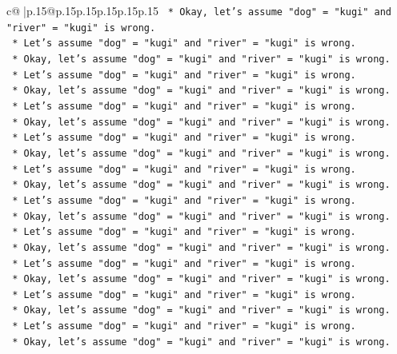 \documentclass{article}
\begin{document}
{\begin{supertabular}{c@{$\;$}|p{.15\linewidth}@{}p{.15\linewidth}p{.15\linewidth}p{.15\linewidth}p{.15\linewidth}p{.15\linewidth}}
{{{\texttt{        *   Okay, let's assume "dog" = "kugi" and "river" = "kugi" is wrong.} \\
\texttt{        *   Let's assume "dog" = "kugi" and "river" = "kugi" is wrong.} \\
\texttt{        *   Okay, let's assume "dog" = "kugi" and "river" = "kugi" is wrong.} \\
\texttt{        *   Let's assume "dog" = "kugi" and "river" = "kugi" is wrong.} \\
\texttt{        *   Okay, let's assume "dog" = "kugi" and "river" = "kugi" is wrong.} \\
\texttt{        *   Let's assume "dog" = "kugi" and "river" = "kugi" is wrong.} \\
\texttt{        *   Okay, let's assume "dog" = "kugi" and "river" = "kugi" is wrong.} \\
\texttt{        *   Let's assume "dog" = "kugi" and "river" = "kugi" is wrong.} \\
\texttt{        *   Okay, let's assume "dog" = "kugi" and "river" = "kugi" is wrong.} \\
\texttt{        *   Let's assume "dog" = "kugi" and "river" = "kugi" is wrong.} \\
\texttt{        *   Okay, let's assume "dog" = "kugi" and "river" = "kugi" is wrong.} \\
\texttt{        *   Let's assume "dog" = "kugi" and "river" = "kugi" is wrong.} \\
\texttt{        *   Okay, let's assume "dog" = "kugi" and "river" = "kugi" is wrong.} \\
\texttt{        *   Let's assume "dog" = "kugi" and "river" = "kugi" is wrong.} \\
\texttt{        *   Okay, let's assume "dog" = "kugi" and "river" = "kugi" is wrong.} \\
\texttt{        *   Let's assume "dog" = "kugi" and "river" = "kugi" is wrong.} \\
\texttt{        *   Okay, let's assume "dog" = "kugi" and "river" = "kugi" is wrong.} \\
\texttt{        *   Let's assume "dog" = "kugi" and "river" = "kugi" is wrong.} \\
\texttt{        *   Okay, let's assume "dog" = "kugi" and "river" = "kugi" is wrong.} \\
\texttt{        *   Let's assume "dog" = "kugi" and "river" = "kugi" is wrong.} \\
\texttt{        *   Okay, let's assume "dog" = "kugi" and "river" = "kugi" is wrong.} \\
}}}
\end{supertabular}}
\end{document}
